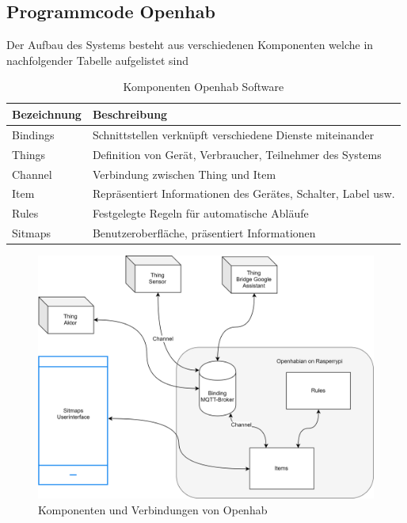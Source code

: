 \subsection{Programmcode Openhab}        
Der Aufbau des Systems besteht aus verschiedenen Komponenten welche in nachfolgender Tabelle aufgelistet sind
\begin{table}[H]
	\begin{tabular}{|l|l|}
		\hline 
		Bezeichnung	& Beschreibung \\ 
		\hline 
		Bindings	& Schnittstellen verknüpft verschiedene Dienste miteinander  \\ 
		\hline 
		Things	& Definition von Gerät, Verbraucher, Teilnehmer des Systems  \\ 
		\hline 
		Channel	& Verbindung zwischen Thing und Item  \\ 
		\hline 
		Item	& Repräsentiert Informationen des Gerätes, Schalter, Label usw. \\ 
		\hline 
		Rules	& Festgelegte Regeln für automatische Abläufe\\ 
		\hline 
		Sitmaps	& Benutzeroberfläche, präsentiert Informationen  \\ 
		\hline 
	\end{tabular} 
	\caption{Komponenten Openhab Software}
	\label{tab: Komponenten Openhab Software}
\end{table}
\begin{figure}[H]
	\centering
	\includegraphics[width=\textwidth]{graphics/Openhabian.png}
	\caption{Komponenten und Verbindungen von Openhab}
	\label{pic: Komponenten Openhab}
\end{figure}   

